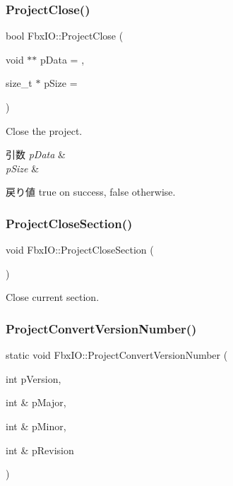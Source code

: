 \subsubsection{\texorpdfstring{Project\+Close()}{ProjectClose()}}
{\footnotesize\ttfamily bool Fbx\+I\+O\+::\+Project\+Close (\begin{DoxyParamCaption}\item[{void $\ast$$\ast$}]{p\+Data = {},  }\item[{size\+\_\+t $\ast$}]{p\+Size = {} }\end{DoxyParamCaption})}

Close the project. 
\begin{DoxyParams}{引数}
{\em p\+Data} & \\
\hline
{\em p\+Size} & \\
\hline
\end{DoxyParams}
\begin{DoxyReturn}{戻り値}
{\ttfamily true} on success, {\ttfamily false} otherwise. 
\end{DoxyReturn}
\mbox{\label{class_fbx_i_o_a6efa56aa583fc29ddcb2dbffe278bcc2}} 
\subsubsection{\texorpdfstring{Project\+Close\+Section()}{ProjectCloseSection()}}
{\footnotesize\ttfamily void Fbx\+I\+O\+::\+Project\+Close\+Section (\begin{DoxyParamCaption}{ }\end{DoxyParamCaption})}

Close current section. \mbox{\label{class_fbx_i_o_aa9f00a69103d7da08583a0aee151fae7}} 
\subsubsection{\texorpdfstring{Project\+Convert\+Version\+Number()}{ProjectConvertVersionNumber()}}
{\footnotesize\ttfamily static void Fbx\+I\+O\+::\+Project\+Convert\+Version\+Number (\begin{DoxyParamCaption}\item[{int}]{p\+Version,  }\item[{int \&}]{p\+Major,  }\item[{int \&}]{p\+Minor,  }\item[{int \&}]{p\+Revision }\end{DoxyParamCaption})\hspace{0.3cm}{\ttfamily [static]}}

